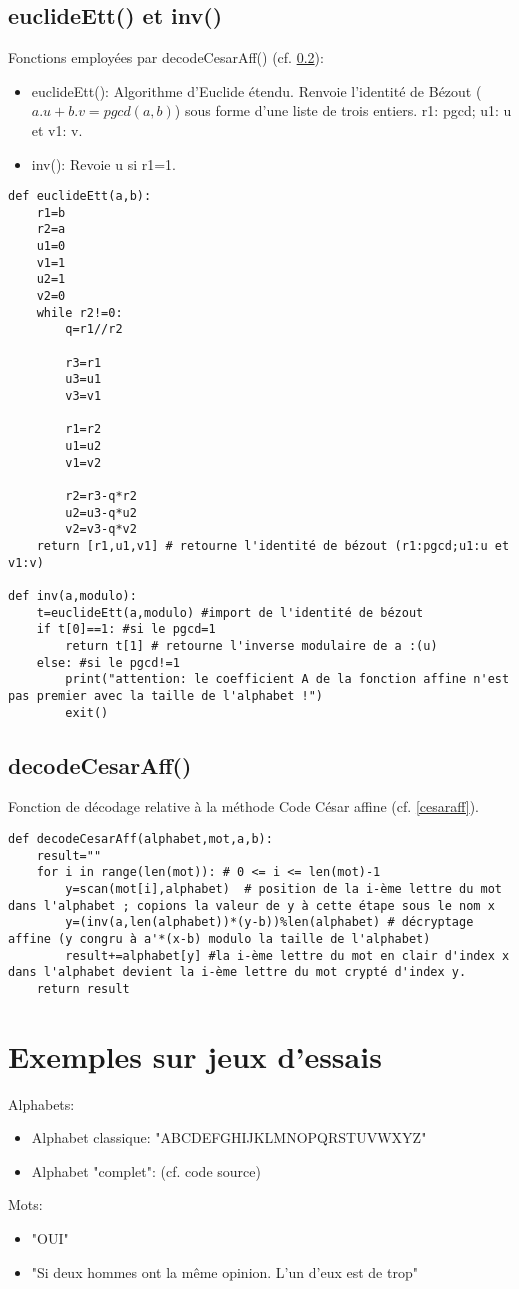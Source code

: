 \documentclass[10pt,a4paper,french]{article}
\begin{document}
\subsection{euclideEtt() et inv()}
Fonctions employées par decodeCesarAff() (cf. \ref{cesaraffc}):
\begin{itemize}
\item euclideEtt(): Algorithme d'Euclide étendu. Renvoie l'identité de Bézout ($a.u+b.v=pgcd(a,b)$) sous forme d'une liste de trois entiers. r1: pgcd; u1: u et v1: v.
\item inv(): Revoie u si r1=1.
\end{itemize}
\begin{lstlisting}
def euclideEtt(a,b):
    r1=b
    r2=a
    u1=0
    v1=1
    u2=1
    v2=0
    while r2!=0:
        q=r1//r2
        
        r3=r1
        u3=u1
        v3=v1

        r1=r2
        u1=u2
        v1=v2

        r2=r3-q*r2
        u2=u3-q*u2
        v2=v3-q*v2
    return [r1,u1,v1] # retourne l'identité de bézout (r1:pgcd;u1:u et v1:v)

def inv(a,modulo):
    t=euclideEtt(a,modulo) #import de l'identité de bézout
    if t[0]==1: #si le pgcd=1
        return t[1] # retourne l'inverse modulaire de a :(u)
    else: #si le pgcd!=1
        print("attention: le coefficient A de la fonction affine n'est pas premier avec la taille de l'alphabet !")
        exit()
\end{lstlisting}
\newpage
\subsection{decodeCesarAff()}\label{cesaraffc}
Fonction de décodage relative à la méthode Code César affine (cf. \ref{cesaraff}).
\begin{lstlisting}
def decodeCesarAff(alphabet,mot,a,b):
    result=""
    for i in range(len(mot)): # 0 <= i <= len(mot)-1
        y=scan(mot[i],alphabet)  # position de la i-ème lettre du mot dans l'alphabet ; copions la valeur de y à cette étape sous le nom x
        y=(inv(a,len(alphabet))*(y-b))%len(alphabet) # décryptage affine (y congru à a'*(x-b) modulo la taille de l'alphabet)
        result+=alphabet[y] #la i-ème lettre du mot en clair d'index x dans l'alphabet devient la i-ème lettre du mot crypté d'index y.
    return result
\end{lstlisting}
\section{Exemples sur jeux d'essais}
\noindent
Alphabets:
\begin{itemize}
\item Alphabet classique: "ABCDEFGHIJKLMNOPQRSTUVWXYZ"
\item Alphabet "complet": (cf. code source)
\end{itemize}
Mots:
\begin{itemize}
\item "OUI"
\item "Si deux hommes ont la même opinion. L'un d'eux est de trop"
\end{itemize}
\end{document}
